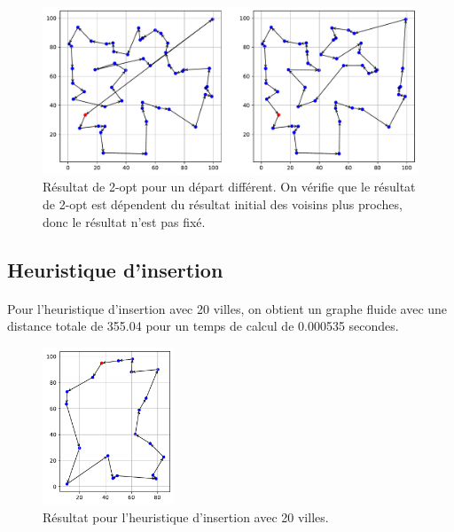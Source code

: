 \documentclass[a4paper,11pt,fleqn]{article}
\begin{document}
\begin{figure}[H]
    \centering
    \includegraphics[width=\textwidth]{images/2opt_50_villes_depart_42.pdf}
    \caption{Résultat de 2-opt pour un départ différent. On vérifie que le résultat de 2-opt est dépendent du résultat initial des voisins plus proches, donc le résultat n'est pas fixé.}
    \label{fig:2opt-dep42}
\end{figure}

\subsection*{Heuristique d'insertion}
\paragraph{}
Pour l'heuristique d'insertion avec 20 villes, on obtient un graphe fluide avec une distance totale de 355.04 pour un temps de calcul de 0.000535 secondes.
\begin{figure}[H]
    \centering
    \includegraphics[width=0.35\textwidth]{images/insertion_20_villes.pdf}
    \caption{Résultat pour l'heuristique d'insertion avec 20 villes.}
    \label{fig:insert-20}
\end{figure}
\end{document}
